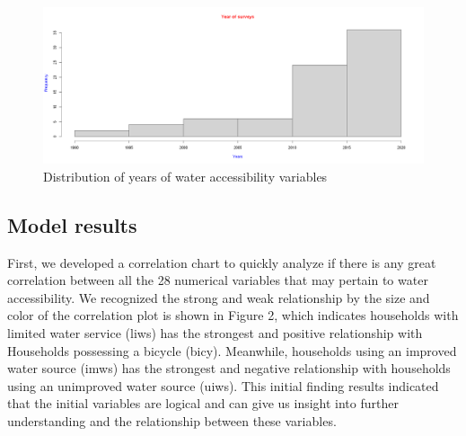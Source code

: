 \documentclass[10pt,twoside]{article}
\numberwithin{equation}{section}
\newcommand{\?}{\stackrel{?}{=}}
\begin{document}
\begin{figure}[h!]
  \centering
  \includegraphics[width=.7\textwidth]{year}
  \caption{Distribution of years of water accessibility variables}
  \label{fig:year}
\end{figure}
\subsection*{Model results}
First, we developed a correlation chart to quickly analyze if there is any great correlation between all the 28 numerical variables that may pertain to water accessibility. We recognized the strong and weak relationship by the size and color of the correlation plot is shown in Figure 2, which indicates households with limited water service (liws) has the strongest and positive relationship with Households possessing a bicycle (bicy). Meanwhile, households using an improved water source (imws) has the strongest and negative relationship with households using an unimproved water source (uiws). This initial finding results indicated that the initial variables are logical and can give us insight into further understanding and the relationship between these variables. 
\end{document}

